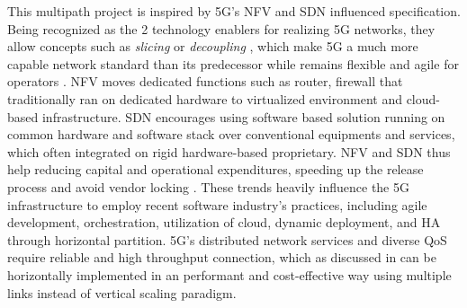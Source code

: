 This multipath project is inspired by \ac{5G}'s \ac{NFV} and \ac{SDN} influenced specification.
Being recognized as the 2 technology enablers for realizing 5G networks, they allow concepts such as \textit{slicing} or \textit{decoupling} \cite{yousaf_nfv_sdn_key_techno_for_5g2017} \cite{open_baton}, which make \ac{5G} a much more capable network standard than its predecessor while remains flexible and agile for operators .
\ac{NFV} moves dedicated functions such as router, firewall that traditionally ran on dedicated hardware to virtualized environment and cloud-based infrastructure.
\ac{SDN} encourages using software based solution running on common hardware and software stack over conventional equipments and services, which often integrated on rigid hardware-based proprietary.
\ac{NFV} and \ac{SDN} thus help reducing capital and operational expenditures, speeding up the release process and avoid vendor locking \cite{yousaf_nfv_sdn_key_techno_for_5g2017}\cite{sun_integrating_2015}.
These trends heavily influence the 5G infrastructure to employ recent software industry's practices, including agile development, orchestration, utilization of cloud, dynamic deployment, and \ac{HA} through horizontal partition.
\ac{5G}'s distributed network services and diverse \ac{QoS} require reliable and high throughput connection, which as discussed in  can be horizontally implemented in an performant and cost-effective way using multiple links instead of vertical scaling paradigm.


